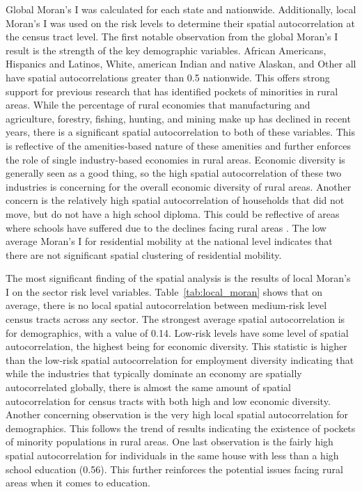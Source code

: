 Global Moran's I was calculated for each state and nationwide. Additionally, local Moran's I was used on the risk levels to determine their spatial autocorrelation at the census tract level. The first notable observation from the global Moran's I result is the strength of the key demographic variables. African Americans, Hispanics and Latinos, White, american Indian and native Alaskan, and Other all have spatial autocorrelations greater than 0.5 nationwide. This offers strong support for previous research that has identified pockets of minorities in rural areas.  While the percentage of rural economies that manufacturing and agriculture, forestry, fishing, hunting, and mining make up has declined in recent years, there is a significant spatial autocorrelation to both of these variables. This is reflective of the amenities-based nature of these amenities and further enforces the role of single industry-based economies in rural areas. Economic diversity is generally seen as a good thing, so the high spatial autocorrelation of these two industries is concerning for the overall economic diversity of rural areas. Another concern is the relatively high spatial autocorrelation of households that did not move, but do not have a high school diploma. This could be reflective of areas where schools have suffered due to the declines facing rural areas \citep{blank_poverty_2005}. The low average Moran's I for residential mobility at the national level indicates that there are not significant spatial clustering of residential mobility. 

The most significant finding of the spatial analysis is the results of local Moran's I on the sector risk level variables. Table~\ref{tab:local_moran} shows that on average, there is no local spatial autocorrelation between medium-risk level census tracts across any sector. The strongest average spatial autocorrelation is for demographics, with a value of 0.14. Low-risk levels have some level of spatial autocorrelation, the highest being for economic diversity. This statistic is higher than the low-risk spatial autocorrelation for employment diversity indicating that while the industries that typically dominate an economy are spatially autocorrelated globally, there is almost the same amount of spatial autocorrelation for census tracts with both high and low economic diversity. Another concerning observation is the very high local spatial autocorrelation for demographics. This follows the trend of results indicating the existence of pockets of minority populations in rural areas. One last observation is the fairly high spatial autocorrelation for individuals in the same house with less than a high school education (0.56). This further reinforces the potential issues facing rural areas when it comes to education.


